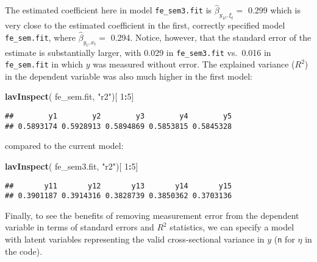 \documentclass[]{interact}
\theoremstyle{plain}%
\theoremstyle{definition}
\theoremstyle{remark}
\newenvironment{Shaded}{\begin{snugshade}}{\end{snugshade}}
\newcommand{\DecValTok}[1]{\textcolor[rgb]{0.00,0.00,0.81}{#1}}
\newcommand{\KeywordTok}[1]{\textcolor[rgb]{0.13,0.29,0.53}{\textbf{#1}}}
\newcommand{\NormalTok}[1]{#1}
\newcommand{\OperatorTok}[1]{\textcolor[rgb]{0.81,0.36,0.00}{\textbf{#1}}}
\newcommand{\StringTok}[1]{\textcolor[rgb]{0.31,0.60,0.02}{#1}}
\begin{document}
\doublespacing

The estimated coefficient here in model \texttt{fe\_sem3.fit} is
\(\hat{\beta}_{y_{1t},\xi_{t}} =\) 0.299 which is very close to the
estimated coefficient in the first, correctly specified model
\texttt{fe\_sem.fit}, where \(\hat{\beta}_{y_{t},x_{t}} =\) 0.294.
Notice, however, that the standard error of the estimate is
substantially larger, with 0.029 in \texttt{fe\_sem3.fit} vs.~0.016 in
\texttt{fe\_sem.fit} in which \(y\) was measured without error. The
explained variance (\(R^{2}\)) in the dependent variable was also much
higher in the first model:

\singlespacing

\begin{Shaded}
\begin{Highlighting}[]
\KeywordTok{lavInspect}\NormalTok{( fe_sem.fit, }\StringTok{"r2"}\NormalTok{)[ }\DecValTok{1}\OperatorTok{:}\DecValTok{5}\NormalTok{]}
\end{Highlighting}
\end{Shaded}

\begin{verbatim}
##        y1        y2        y3        y4        y5 
## 0.5893174 0.5928913 0.5894869 0.5853815 0.5845328
\end{verbatim}

\doublespacing

compared to the current model:

\singlespacing

\begin{Shaded}
\begin{Highlighting}[]
\KeywordTok{lavInspect}\NormalTok{( fe_sem3.fit, }\StringTok{"r2"}\NormalTok{)[ }\DecValTok{1}\OperatorTok{:}\DecValTok{5}\NormalTok{]}
\end{Highlighting}
\end{Shaded}

\begin{verbatim}
##       y11       y12       y13       y14       y15 
## 0.3901187 0.3914316 0.3828739 0.3850362 0.3703136
\end{verbatim}

\doublespacing

Finally, to see the benefits of removing measurement error from the
dependent variable in terms of standard errors and \(R^{2}\) statistics,
we can specify a model with latent variables representing the valid
cross-sectional variance in \(y\) (\texttt{n} for \(\eta\) in the code).
\end{document}
